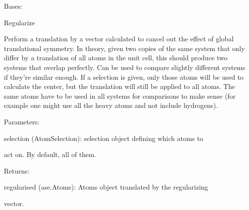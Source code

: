 \documentclass[letterpaper,10pt,english]{sphinxmanual}
\begin{document}

\begin{fulllineitems}
\label{doctree/soprano.properties.transform.transform:soprano.properties.transform.transform.Regularise}
Bases: {\hyperref[doctree/soprano.properties.atomsproperty:soprano.properties.atomsproperty.AtomsProperty]{}}

Regularize

Perform a translation by a vector calculated to cancel out the effect of
global translational symmetry. In theory, given two copies of the same
system that only differ by a translation of all atoms in the unit cell,
this should produce two systems that overlap perfectly. Can be used to
compare slightly different systems if they're similar enough. If a
selection is given, only those atoms will be used to calculate the center,
but the translation will still be applied to all atoms. The same atoms
have to be used in all systems for comparisons to make sense (for example
one might use all the heavy atoms and not include hydrogens).

\begin{DUlineblock}{0em}
\item[] Parameters:
\item[]
\begin{DUlineblock}{\DUlineblockindent}
\item[] selection (AtomSelection): selection object defining which atoms to
\item[]
\begin{DUlineblock}{\DUlineblockindent}
\item[] act on. By default, all of them.
\end{DUlineblock}
\end{DUlineblock}
\end{DUlineblock}

\begin{DUlineblock}{0em}
\item[] Returns:
\item[]
\begin{DUlineblock}{\DUlineblockindent}
\item[] regularised (ase.Atoms): Atoms object translated by the regularizing
\item[]
\begin{DUlineblock}{\DUlineblockindent}
\item[] vector.
\end{DUlineblock}
\end{DUlineblock}
\end{DUlineblock}


\end{fulllineitems}
\end{document}
